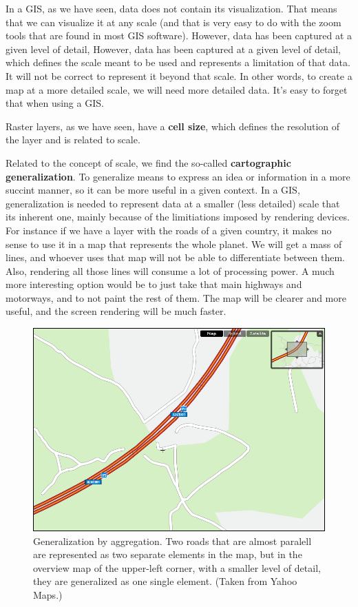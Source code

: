 In a GIS, as we have seen, data does not contain its visualization. That means that we can visualize it at any scale (and that is very easy to do with the zoom tools that are found in most GIS software). However, data has been captured at a given level of detail, However, data has been captured at a given level of detail, which defines the scale meant to be used and represents a limitation of that data. It will not be correct to represent it beyond that scale. In other words, to create a map at a more detailed scale, we will need more detailed data. It's easy to forget that when using a GIS.

Raster layers, as we have seen, have a \textbf{cell size}, which defines the resolution of the layer and is related to scale.

Related to the concept of scale, we find the so-called \textbf{cartographic generalization}. To generalize means to express an idea or information in a more succint manner, so it can be more useful in a given context. In a GIS, generalization is needed to represent data at a smaller (less detailed) scale that its inherent one, mainly because of the limitiations imposed by rendering devices. For instance if we have a layer with the roads of a given country, it makes no sense to use it in a map that represents the whole planet. We will get a mass of lines, and whoever uses that map will not be able to differentiate between them. Also, rendering all those lines will consume a lot of processing power. A much more interesting option would be to just take that main highways and motorways, and to not paint the rest of them. The map will be clearer and more useful, and the screen rendering will be much faster.

\begin{figure}[!hbt]
\centering
\includegraphics[width=.75\columnwidth]{Cartography/Generalization_aggregation.png}
\caption{\small Generalization by aggregation. Two roads that are almost paralell are represented as two separate elements in the map, but in the overview map of the upper-left corner, with a smaller level of detail, they are generalized as one single element. (Taken from Yahoo Maps.)}
\label{Fig:Generalization_aggregation} 
\end{figure}


